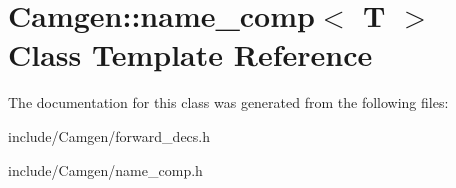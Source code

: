 \hypertarget{a00381}{}\section{Camgen\+:\+:name\+\_\+comp$<$ T $>$ Class Template Reference}
\label{a00381}


The documentation for this class was generated from the following files\+:\begin{DoxyCompactItemize}
\item 
include/\+Camgen/forward\+\_\+decs.\+h\item 
include/\+Camgen/name\+\_\+comp.\+h\end{DoxyCompactItemize}
